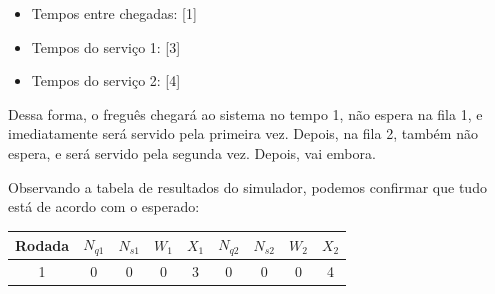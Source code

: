 \documentclass[a4paper,12pt]{report}
\begin{document}
\vspace{-1.5em}
\begin{itemize}
	\itemsep0pt
	\item Tempos entre chegadas: [1]
    \item Tempos do serviço 1: [3]
    \item Tempos do serviço 2: [4]
\end{itemize}

Dessa forma, o freguês chegará ao sistema no tempo 1, não espera na fila 1, e imediatamente será servido pela primeira vez. Depois, na fila 2, também não espera, e será servido pela segunda vez. Depois, vai embora.

Observando a tabela de resultados do simulador, podemos confirmar que tudo está de acordo com o esperado:

\begin{center}
\begin{tabular}{ c c c c c c c c c }
  \hline
  \textbf{Rodada} & $N_{q1}$ & $N_{s1}$ & $W_1$ & $X_1$ & $N_{q2}$ & $N_{s2}$ & $W_2$ & $X_2$ \\
  \hline
  1 & 0 & 0 & 0 & 3 & 0 & 0 & 0 & 4 \\
\end{tabular}
\end{center}
\end{document}
